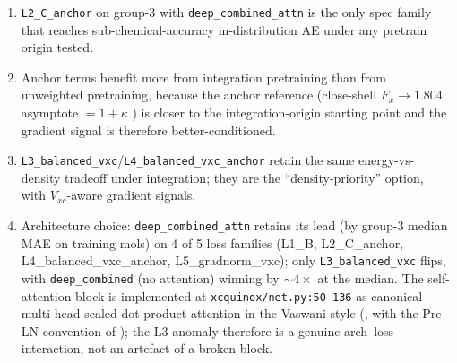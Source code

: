 \documentclass[11pt,letterpaper]{article}
\begin{document}
\begin{enumerate}
\item \texttt{L2\_C\_anchor} on group-3 with \texttt{deep\_combined\_attn} is
  the only spec family that reaches sub-chemical-accuracy in-distribution
  AE under any pretrain origin tested.
\item Anchor terms benefit more from integration pretraining than from
  unweighted pretraining, because the anchor reference (close-shell
  $F_x \!\to\! 1.804$ asymptote $= 1+\kappa$ \citep{PerdewBurkeErnzerhof1996})
  is closer to the integration-origin starting point and the gradient signal
  is therefore better-conditioned.
\item \texttt{L3\_balanced\_vxc}/\texttt{L4\_balanced\_vxc\_anchor} retain the
  same energy-vs-density tradeoff under integration; they are the
  ``density-priority'' option, with $V_{xc}$-aware gradient signals.
\item Architecture choice: \texttt{deep\_combined\_attn} retains its lead
  (by group-3 median MAE on training mols) on 4 of 5 loss families
  (L1\_B, L2\_C\_anchor, L4\_balanced\_vxc\_anchor, L5\_gradnorm\_vxc);
  only \texttt{L3\_balanced\_vxc} flips, with \texttt{deep\_combined}
  (no attention) winning by $\sim\!4\times$ at the median. The
  self-attention block is implemented at
  \texttt{xcquinox/net.py:50--136} as canonical multi-head
  scaled-dot-product attention in the Vaswani style
  (\citealp{VaswaniAttention2017}, with the Pre-LN convention of
  \citealp{XiongPreLN2020}); the L3 anomaly therefore is a genuine
  arch--loss interaction, not an artefact of a broken block.
\end{enumerate}



\end{document}
